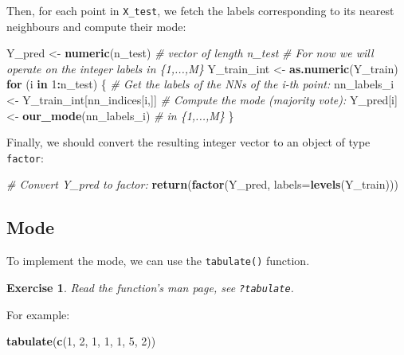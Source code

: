 \documentclass[10pt,b5paper,krantz1]{krantz}
\newenvironment{Shaded}{\begin{snugshade}}{\end{snugshade}}
\newcommand{\CommentTok}[1]{\textcolor[rgb]{0.37,0.37,0.37}{\textit{#1}}}
\newcommand{\ControlFlowTok}[1]{\textcolor[rgb]{0.27,0.27,0.27}{\textbf{#1}}}
\newcommand{\DataTypeTok}[1]{\textcolor[rgb]{0.27,0.27,0.27}{#1}}
\newcommand{\DecValTok}[1]{\textcolor[rgb]{0.06,0.06,0.06}{#1}}
\newcommand{\KeywordTok}[1]{\textcolor[rgb]{0.27,0.27,0.27}{\textbf{#1}}}
\newcommand{\NormalTok}[1]{#1}
\newcommand{\OperatorTok}[1]{\textcolor[rgb]{0.43,0.43,0.43}{\textbf{#1}}}
\newcommand{\StringTok}[1]{\textcolor[rgb]{0.5,0.5,0.5}{#1}}
\newtheorem{exercise}{Exercise}[chapter]
\begin{document}
Then, for each point in \texttt{X\_test},
we fetch the labels corresponding to its nearest neighbours
and compute their mode:

\begin{Shaded}
\begin{Highlighting}[]
\NormalTok{Y_pred <-}\StringTok{ }\KeywordTok{numeric}\NormalTok{(n_test) }\CommentTok{# vector of length n_test}
\CommentTok{# For now we will operate on the integer labels in \{1,...,M\}}
\NormalTok{Y_train_int <-}\StringTok{ }\KeywordTok{as.numeric}\NormalTok{(Y_train)}
\ControlFlowTok{for}\NormalTok{ (i }\ControlFlowTok{in} \DecValTok{1}\OperatorTok{:}\NormalTok{n_test) \{}
    \CommentTok{# Get the labels of the NNs of the i-th point:}
\NormalTok{    nn_labels_i <-}\StringTok{ }\NormalTok{Y_train_int[nn_indices[i,]]}
    \CommentTok{# Compute the mode (majority vote):}
\NormalTok{    Y_pred[i] <-}\StringTok{ }\KeywordTok{our_mode}\NormalTok{(nn_labels_i) }\CommentTok{# in \{1,...,M\}}
\NormalTok{\}}
\end{Highlighting}
\end{Shaded}

Finally, we should convert the resulting integer vector
to an object of type \texttt{factor}:

\begin{Shaded}
\begin{Highlighting}[]
\CommentTok{# Convert Y_pred to factor:}
\KeywordTok{return}\NormalTok{(}\KeywordTok{factor}\NormalTok{(Y_pred, }\DataTypeTok{labels=}\KeywordTok{levels}\NormalTok{(Y_train)))}
\end{Highlighting}
\end{Shaded}

\hypertarget{mode}{%
\subsection{Mode}\label{mode}}

To implement the mode, we can use the \texttt{tabulate()} function.

\begin{exercise}

Read the function's man page, see \texttt{?tabulate}.

\end{exercise}

For example:

\begin{Shaded}
\begin{Highlighting}[]
\KeywordTok{tabulate}\NormalTok{(}\KeywordTok{c}\NormalTok{(}\DecValTok{1}\NormalTok{, }\DecValTok{2}\NormalTok{, }\DecValTok{1}\NormalTok{, }\DecValTok{1}\NormalTok{, }\DecValTok{1}\NormalTok{, }\DecValTok{5}\NormalTok{, }\DecValTok{2}\NormalTok{))}
\end{Highlighting}
\end{Shaded}
\end{document}

